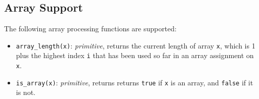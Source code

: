\subsection*{Array Support}

The following array processing functions are supported:

\begin{itemize}
\item \lstinline{array_length(x)}: \textit{primitive}, returns
  the current length of array \lstinline{x}, which is 1 plus the
highest index \lstinline{i} that has been used so far in an array assignment on \lstinline{x}.
\item \lstinline{is_array(x)}: \textit{primitive}, returns
  returns \texttt{true} if \texttt{x} is an array, and \texttt{false} if it is not.
\end{itemize}

  


